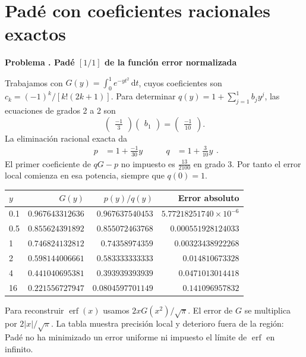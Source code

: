 \documentclass[11pt,a4paper]{article}
\newcommand{\dd}{\,\mathrm d}
\theoremstyle{definition}
\DeclareMathOperator{\erf}{erf}
\newcounter{problema}
\newenvironment{resuelto}[1]{\refstepcounter{problema}\par\medskip\Needspace{6\baselineskip}\textbf{Problema \theproblema. #1}\par}{\par\medskip}
\begin{document}
\section{Padé con coeficientes racionales exactos}
\begin{resuelto}{Padé $[1/1]$ de la función error normalizada}
Trabajamos con $G(y)=\int_0^1e^{-yt^2}\dd t$, cuyos coeficientes son $c_k=(-1)^k/[k!(2k+1)]$. Para determinar $q(y)=1+\sum_{j=1}^{1}b_jy^j$, las ecuaciones de grados 2 a 2 son
\[
\begin{pmatrix}\frac{-1}{3}\end{pmatrix}
\begin{pmatrix}b_{1}\end{pmatrix}
=\begin{pmatrix}\frac{-1}{10}\end{pmatrix}.
\]
La eliminación racional exacta da
\[
\begin{aligned}p&=1+\frac{-1}{30}y\end{aligned}
\qquad \begin{aligned}q&=1+\frac{3}{10}y\end{aligned}.
\]
El primer coeficiente de $qG-p$ no impuesto es $\frac{13}{2100}$ en grado 3. Por tanto el error local comienza en esa potencia, siempre que $q(0)=1$.

\begin{center}\small\begin{tabular}{lrrr}
\toprule
$y$ & $G(y)$ & $p(y)/q(y)$ & Error absoluto\\\midrule
0.1 & $0.967643312636$ & $0.967637540453$ & $5.77218251740\times10^{-6}$\\
0.5 & $0.855624391892$ & $0.855072463768$ & $0.000551928124033$\\
1 & $0.746824132812$ & $0.74358974359$ & $0.00323438922268$\\
2 & $0.598144006661$ & $0.583333333333$ & $0.014810673328$\\
4 & $0.441040695381$ & $0.393939393939$ & $0.0471013014418$\\
16 & $0.221556727947$ & $0.0804597701149$ & $0.141096957832$\\
\bottomrule\end{tabular}\end{center}

Para reconstruir $\erf(x)$ usamos $2xG(x^2)/\sqrt\pi$. El error de $G$ se multiplica por $2|x|/\sqrt\pi$. La tabla muestra precisión local y deterioro fuera de la región: Padé no ha minimizado un error uniforme ni impuesto el límite de $\erf$ en infinito.
\end{resuelto}
\end{document}
